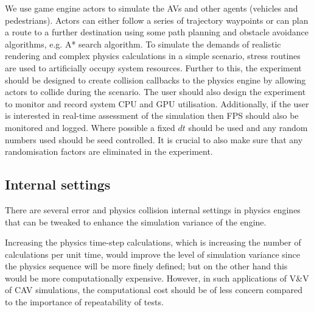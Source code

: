 We use game engine actors to simulate the AVs and other agents (vehicles and pedestrians). Actors can either follow a series of trajectory waypoints or can plan a route to a further destination using some path planning and obstacle avoidance algorithms, e.g. A* search algorithm. 
% 
To simulate the demands of realistic rendering and complex physics calculations in a simple scenario, stress routines are used to artificially occupy system resources. 
Further to this, the experiment should be designed to create collision callbacks to the physics engine by allowing actors to collide during the scenario. 
%
The user should also design the experiment to monitor and record system CPU and GPU utilisation. Additionally, if the user is interested in real-time assessment of the simulation then FPS should also be monitored and logged.
%
Where possible a fixed $dt$ should be used and any random numbers used should be seed controlled.
It is crucial to also make sure that any randomisation factors are eliminated in the experiment.
%
\subsection{Internal settings}
There are several error and physics collision internal settings in physics engines that can be tweaked to enhance the simulation variance of the engine.

Increasing the physics time-step calculations, which is increasing the number of calculations per unit time, would improve the level of simulation variance since the physics sequence will be more finely defined; but on the other hand this would be more computationally expensive. However, in such applications of V\&V of CAV simulations, the computational cost should be of less concern compared to the importance of repeatability of tests.

